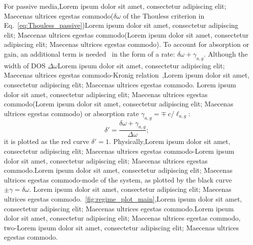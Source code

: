 For passive media,Lorem ipsum dolor sit amet, consectetur adipiscing elit; Maecenas ultrices egestas commodo($\delta \omega$ of the Thouless criterion in Eq.~\ref{eq:Thouless_passive})Lorem ipsum dolor sit amet, consectetur adipiscing elit; Maecenas ultrices egestas commodo(Lorem ipsum dolor sit amet, consectetur adipiscing elit; Maecenas ultrices egestas commodo). To account for absorption or gain, an additional term is needed~\cite{2005_Yamilov_correlations} in the form of a rate: 
$\delta \omega +\gamma_{a,g}$.
Although the width of DOS $\Delta \omega$Lorem ipsum dolor sit amet, consectetur adipiscing elit; Maecenas ultrices egestas commodo-Kronig relation~\cite{1999_Jackson},Lorem ipsum dolor sit amet, consectetur adipiscing elit; Maecenas ultrices egestas commodo. 
Lorem ipsum dolor sit amet, consectetur adipiscing elit; Maecenas ultrices egestas commodo(Lorem ipsum dolor sit amet, consectetur adipiscing elit; Maecenas ultrices egestas commodo\cite{1968_Letokhov}) or absorption rate $\gamma_{a,g}=\mp~c/\ell_{a,g}$:
\begin{equation}
\delta'=\frac{\delta \omega +\gamma_{a,g}}{\Delta \omega};
\label{eq:generalized_thouless}
\end{equation}
it is plotted as the red curve $\delta'=1$. Physically,Lorem ipsum dolor sit amet, consectetur adipiscing elit; Maecenas ultrices egestas commodo-Lorem ipsum dolor sit amet, consectetur adipiscing elit; Maecenas ultrices egestas commodo.Lorem ipsum dolor sit amet, consectetur adipiscing elit; Maecenas ultrices egestas commodo-mode of the system, as plotted by the black curve $\pm \gamma = \delta \omega$. %
Lorem ipsum dolor sit amet, consectetur adipiscing elit; Maecenas ultrices egestas commodo.~\ref{fig:regime_plot_main},Lorem ipsum dolor sit amet, consectetur adipiscing elit; Maecenas ultrices egestas commodo.Lorem ipsum dolor sit amet, consectetur adipiscing elit; Maecenas ultrices egestas commodo, two-Lorem ipsum dolor sit amet, consectetur adipiscing elit; Maecenas ultrices egestas commodo.

